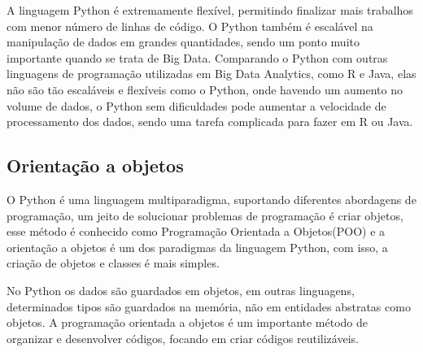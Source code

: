         A linguagem Python é extremamente flexível, permitindo finalizar mais trabalhos com menor número de linhas de código. O Python também é escalável na manipulação de dados em grandes quantidades, sendo um ponto muito importante quando se trata de Big Data. Comparando o Python com outras linguagens de programação utilizadas em Big Data Analytics, como R e Java, elas não são tão escaláveis e flexíveis como o Python, onde havendo um aumento no volume de dados, o Python sem dificuldades pode aumentar a velocidade de processamento dos dados, sendo uma tarefa complicada para fazer em R ou Java. \cite{McKinney2019}

        \subsection{Orientação a objetos}  
        O Python é uma linguagem multiparadigma, suportando diferentes abordagens de programação, um jeito de solucionar problemas de programação é criar objetos, esse método é conhecido como Programação Orientada a Objetos(POO) e a orientação a objetos é um dos paradigmas da linguagem Python, com isso, a criação de objetos e classes é mais simples. 
        
        No Python os dados são guardados em objetos, em outras linguagens, determinados tipos são guardados na memória, não em entidades abstratas como objetos. A programação orientada a objetos é um importante método de organizar e desenvolver códigos, focando em criar códigos reutilizáveis. \cite{Lutz2007}
        
